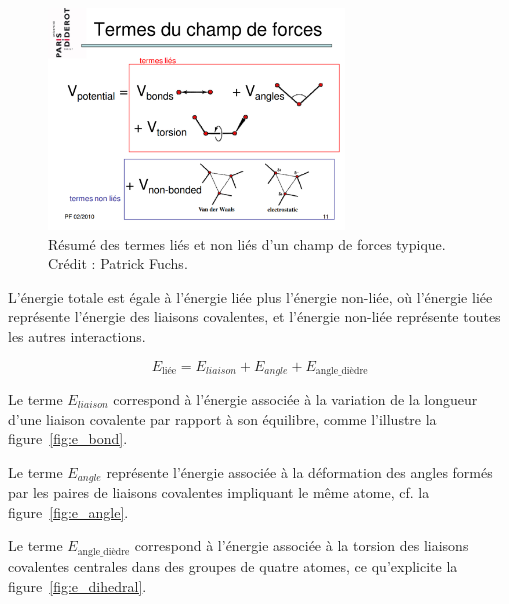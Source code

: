 	\begin{figure}[H]
		\centering
		\includegraphics[width=0.7\textwidth]{figures/ch1/ffterms}
		\caption[Termes d'un champ de forces.]{Résumé des termes liés et non liés d'un champ de forces typique. Crédit : Patrick Fuchs.}
		\label{fig:ffterms}
	\end{figure}	
	
	L'énergie totale est égale à l'énergie liée plus l'énergie non-liée, où l'énergie liée représente l'énergie des liaisons covalentes, et l'énergie non-liée représente toutes les autres interactions.
	
	\begin{equation}
		\label{eq:ebonded}
		E_\text{liée} = E_{liaison} + E_{angle} + E_\text{angle\_{}dièdre}
	\end{equation}
	
	Le terme $E_{liaison}$ correspond à l'énergie associée à la variation de la longueur d'une liaison covalente par rapport à son équilibre, comme l'illustre la figure~\ref{fig:e_bond}.
	
	Le terme $E_{angle}$ représente l'énergie associée à la déformation des angles formés par les paires de liaisons covalentes impliquant le même atome, cf. la figure~\ref{fig:e_angle}.
	
	Le terme $E_\text{angle\_{}dièdre}$ correspond à l'énergie associée à la \og torsion \fg{} des liaisons covalentes centrales dans des groupes de quatre atomes, ce qu'explicite la figure~\ref{fig:e_dihedral}.
	

